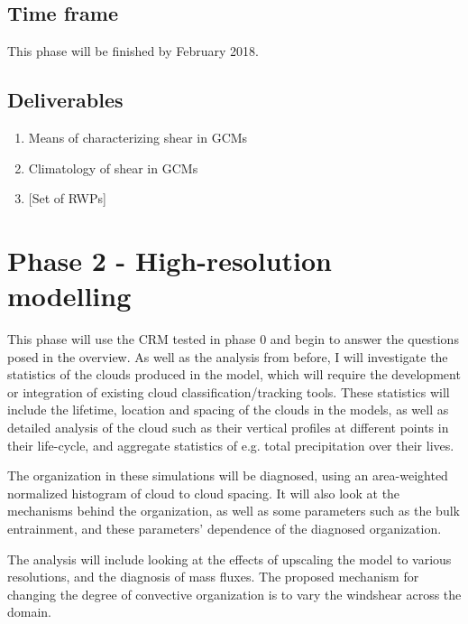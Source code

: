 \documentclass[11pt,a4paper]{article}
\begin{document}
\subsection*{Time frame}

This phase will be finished by February 2018.

\subsection*{Deliverables}
\begin{enumerate}
    \item Means of characterizing shear in GCMs
    \item Climatology of shear in GCMs
    \item {[Set of RWPs]}
\end{enumerate}

\section*{Phase 2 - High-resolution modelling}
This phase will use the CRM tested in phase 0 and begin to answer the questions posed in the overview. As well as the analysis from before, I will investigate the statistics of the clouds produced in the model, which will require the development or integration of existing cloud classification/tracking tools. These statistics will include the lifetime, location and spacing of the clouds in the models, as well as detailed analysis of the cloud such as their vertical profiles at different points in their life-cycle, and aggregate statistics of e.g. total precipitation over their lives.

The organization in these simulations will be diagnosed, using an area-weighted normalized histogram of cloud to cloud spacing. It will also look at the mechanisms behind the organization, as well as some parameters such as the bulk entrainment, and these parameters' dependence of the diagnosed organization.

The analysis will include looking at the effects of upscaling the model to various resolutions, and the diagnosis of mass fluxes. The proposed mechanism for changing the degree of convective organization is to vary the windshear across the domain.
\end{document}
